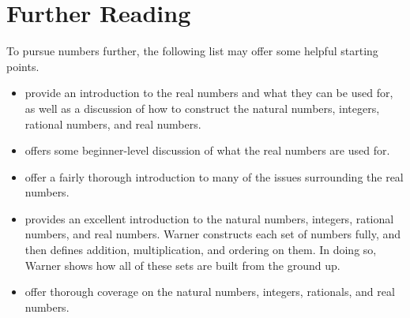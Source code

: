 \documentclass[../../../main.tex]{subfiles}
\begin{document}
\chapter{Further Reading}

To pursue numbers further, the following list may offer some helpful starting points. 

\begin{itemize}

  \item \citet[ch.~1 and appendix A]{Cummings2018} provide an introduction to the real numbers and what they can be used for, as well as a discussion of how to construct the natural numbers, integers, rational numbers, and real numbers.

  \item \citet[chs.~6, 16]{Stewart1995} offers some beginner-level discussion of what the real numbers are used for.

  \item \citet[chs.~2, 9, 10]{StewartAndTall2015} offer a fairly thorough introduction to many of the issues surrounding the real numbers.
  
  \item \citet[ch.~5]{Warner2019} provides an excellent introduction to the natural numbers, integers, rational numbers, and real numbers. Warner constructs each set of numbers fully, and then defines addition, multiplication, and ordering on them. In doing so, Warner shows how all of these sets are built from the ground up.
  
  \item \citet[chs.~2, 3, 4, 6, and 14, 15]{MaddenAndAubrey2017} offer thorough coverage on the natural numbers, integers, rationals, and real numbers.
    
\end{itemize}
\end{document}
